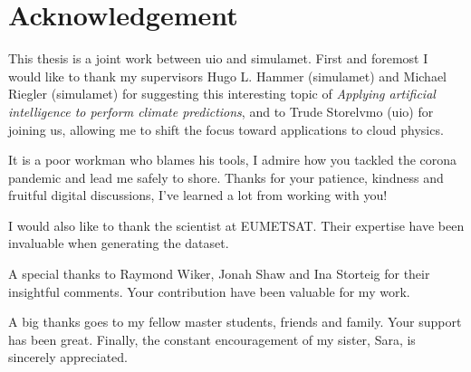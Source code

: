 \chapter*{Acknowledgement}
This thesis is a joint work between \acrfull{uio} and \acrfull{simulamet}. First and foremost I would like to thank my supervisors Hugo L. Hammer (\acrshort{simulamet}) and Michael Riegler (\acrshort{simulamet}) for suggesting this interesting topic of \textit{Applying artificial intelligence to perform climate predictions}, and to Trude Storelvmo (\acrshort{uio}) for joining us, allowing me to shift the focus toward applications to cloud physics.

It is a poor workman who blames his tools, I admire how you tackled the corona pandemic and lead me safely to shore. Thanks for your patience, kindness and fruitful digital discussions, I've learned a lot from working with you!

I would also like to thank the scientist at EUMETSAT. 
Their expertise have been invaluable when generating the dataset. 

A special thanks to Raymond Wiker, Jonah Shaw and Ina Storteig for their %
insightful comments. Your contribution have been valuable for my work.

A big thanks goes to my fellow master students, friends and family. Your support has been great. Finally, the constant encouragement of my sister, Sara, is sincerely appreciated.
\cleardoublepage